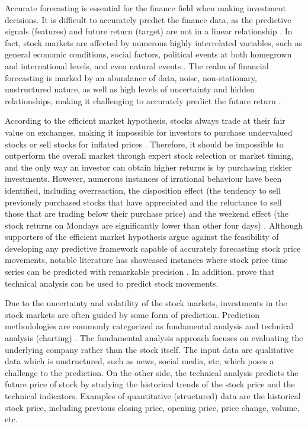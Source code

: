 \documentclass{article}
\begin{document}
Accurate forecasting is essential for the finance field when making investment decisions. It is difficult to accurately predict the finance data, as the predictive signals (features) and future return (target) are not in a linear relationship \citep{fischer2018deep}. In fact, stock markets are affected by numerous highly interrelated variables, such as general economic conditions, social factors, political events at both homegrown and international levels, and even natural events \citep{enke2005use, nti2020systematic}. The realm of financial forecasting is marked by an abundance of data, noise, non-stationary, unstructured nature, as well as high levels of uncertainty and hidden relationships, making it challenging to accurately predict the future return \citep{bao2004forecasting}.

According to the efficient market hypothesis, stocks always trade at their fair value on exchanges, making it impossible for investors to purchase undervalued stocks or sell stocks for inflated prices \citep{yen2008efficient}. Therefore, it should be impossible to outperform the overall market through expert stock selection or market timing, and the only way an investor can obtain higher returns is by purchasing riskier investments. However, numerous instances of irrational behaviour have been identified, including overreaction, the disposition effect (the tendency to sell previously purchased stocks that have appreciated and the reluctance to sell those that are trading below their purchase price) and the weekend effect (the stock returns on Mondays are significantly lower than other four days) \citep{hsu2016bridging}. Although supporters of the efficient market hypothesis argue against the feasibility of developing any predictive framework capable of accurately forecasting stock price movements, notable literature has showcased instances where stock price time series can be predicted with remarkable precision \citep{lewellen2002momentum, schwartz1977time}. In addition, \cite{lo2000foundations} prove that technical analysis can be used to predict stock movements.  

Due to the uncertainty and volatility of the stock markets, investments in the stock markets are often guided by some form of prediction. Prediction methodologies are commonly categorized as fundamental analysis and technical analysis (charting) \citep{attigeri2015stock, nti2020systematic, ican2017stock, li2015tensor}. The fundamental analysis approach focuses on evaluating the underlying company rather than the stock itself. The input data are qualitative data which is unstructured, such as news, social media, etc, which poses a challenge to the prediction. On the other side, the technical analysis predicts the future price of stock by studying the historical trends of the stock price and the technical indicators. Examples of quantitative (structured) data are the historical stock price, including previous closing price, opening price, price change, volume, etc. 
\end{document}
